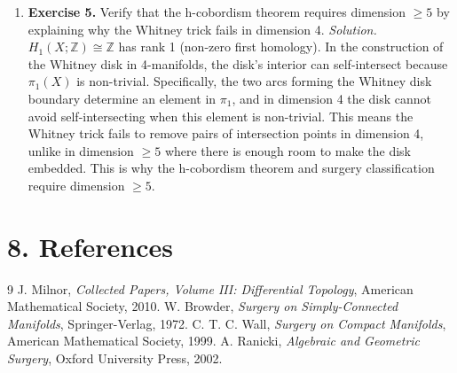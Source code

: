 \begin{enumerate}[leftmargin=*,itemsep=0.9em]
\item \textbf{Exercise 5.} Verify that the h-cobordism theorem requires dimension $\geq 5$ by explaining why the Whitney trick fails in dimension 4. \emph{Solution.}$H_1(X; \mathbb{Z}) \cong \mathbb{Z}$ has rank 1 (non-zero first homology). In the construction of the Whitney disk in 4-manifolds, the disk's interior can self-intersect because $\pi_1(X)$ is non-trivial. Specifically, the two arcs forming the Whitney disk boundary determine an element in $\pi_1$, and in dimension 4 the disk cannot avoid self-intersecting when this element is non-trivial. This means the Whitney trick fails to remove pairs of intersection points in dimension 4, unlike in dimension $\geq 5$ where there is enough room to make the disk embedded. This is why the h-cobordism theorem and surgery classification require dimension $\geq 5$.

\end{enumerate}
\section*{8. References}
\begin{thebibliography}{9}
 J. Milnor, \emph{Collected Papers, Volume III: Differential Topology}, American Mathematical Society, 2010.
 W. Browder, \emph{Surgery on Simply-Connected Manifolds}, Springer-Verlag, 1972.
 C. T. C. Wall, \emph{Surgery on Compact Manifolds}, American Mathematical Society, 1999.
 A. Ranicki, \emph{Algebraic and Geometric Surgery}, Oxford University Press, 2002.
\end{thebibliography}
